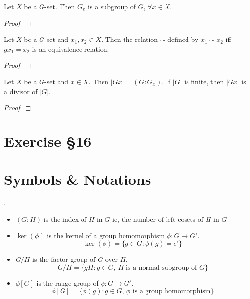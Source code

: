 \begin{theorem}
	Let $X$ be a $G$-set.
	Then $G_x$ is a subgroup of $G$, $\forall x \in X$.
\end{theorem}
\begin{proof}
\end{proof}

\begin{theorem}
	Let $X$ be a $G$-set and $x_1,x_2 \in X$.
	Then the relation $\sim$ defined by $x_1 \sim x_2$ iff $gx_1 = x_2$ is an equivalence relation.
\end{theorem}
\begin{proof}
\end{proof}

\begin{theorem}
	Let $X$ be a $G$-set and $x \in X$.
	Then $|Gx| = (G:G_x)$.
	If $|G|$ is finite, then $|Gx|$ is a divisor of $|G|$.
\end{theorem}
\begin{proof}
\end{proof}


\section{Exercise \S16}


\section*{Symbols \& Notations}
\begin{definition}.
	\begin{itemize}
		\item $(G:H)$ is the index of $H$ in $G$ ie, the number of left cosets of $H$ in $G$ %
		\item $\ker(\phi)$ is the kernel of a group homomorphism $\phi : G \to G'$.
			$$\ker(\phi) = \{ g \in G : \phi(g) = e' \}$$
		\item $G/H$ is the factor group of $G$ over $H$.
			$$G/H = \{ gH : g \in G,\ H \text{ is a normal subgroup of } G\}$$
		\item $\phi[G]$ is the range group of $\phi: G \to G'$.
			$$\phi[G] = \{ \phi(g) : g \in G,\ \phi \text{ is a group homomorphism} \}$$
	\end{itemize}
\end{definition}
